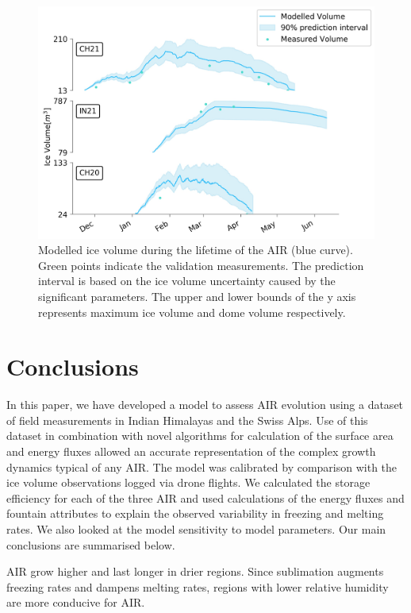 \documentclass[utf8]{frontiersSCNS} %
\begin{document}
\begin{figure}
	\begin{center}
		\includegraphics[width=\linewidth]{Figures/icev_results.jpg}
	\end{center}
	\caption{Modelled ice volume during the lifetime of the AIR (blue curve). Green points indicate the validation
		measurements. The prediction interval is based on the ice volume uncertainty caused by the significant parameters.  The
		upper and lower bounds of the y axis represents maximum ice volume and dome volume respectively.  }
	\label{fig:results} \end{figure}

\section{Conclusions}
In this paper, we have developed a model to assess AIR evolution using a dataset of field measurements in Indian
Himalayas and the Swiss Alps. Use of this dataset in combination with novel algorithms for calculation of the surface
area and energy fluxes allowed an accurate representation of the complex growth dynamics typical of any AIR. The model
was calibrated by comparison with the ice volume observations logged via drone flights. We calculated the storage
efficiency for each of the three AIR and used calculations of the energy fluxes and fountain attributes to explain the
observed variability in freezing and melting rates. We also looked at the model sensitivity to model parameters. Our
main conclusions are summarised below.

AIR grow higher and last longer in drier regions. Since sublimation augments freezing rates and dampens melting
rates, regions with lower relative humidity are more conducive for AIR.
\end{document}
